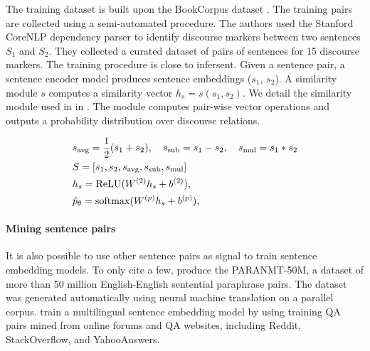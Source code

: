 The training dataset is built upon the BookCorpus dataset \parencite{zhu_15}. The training pairs are collected using a semi-automated procedure. The authors used the Stanford CoreNLP dependency parser \parencite{schuster_16} to identify discourse markers between two sentences $S_1$ and $S_2$. They collected a curated dataset of  pairs of sentences for 15 discourse markers. The training procedure is close to infersent. Given a sentence pair, a sentence encoder model produces sentence embeddings ($s_1$, $s_2$). A similarity module $s$ computes a similarity vector $h_s = s(s_1, s_2)$. We detail the similarity module used in \textcite{nie_19} in . The module computes pair-wise vector operations and outputs a probability distribution over discourse relations.

\begin{equation}
\begin{split}
    &s_{\text{avg}} = \frac{1}{2} (s_1 + s_2), ~~~s_{\text{sub}} = s_1 - s_2, ~~~s_{\text{mul}} = s_1 * s_2 \\
    &S = [s_1, s_2, s_{\text{avg}}, s_{\text{sub}}, s_{\text{mul}}]\\
    &h_s = \relu(W^{(2)}h_s + b^{(2)}), \\
    &\hat{p}_{\theta} = \softmax(W^{(p)}h_s + b^{(p)}), \\
\end{split}
\labeq{similarity:2}
\end{equation}

\paragraph{Mining sentence pairs} 

It is also possible to use other sentence pairs as signal to train sentence embedding models. To only cite a few, \textcite{gimpel_18} produce the PARANMT-50M, a dataset of more than 50 million English-English sentential paraphrase pairs. The dataset was generated automatically using neural machine translation on a parallel corpus. \textcite{yang_20} train a multilingual sentence embedding model by using training QA pairs mined from online forums and QA websites, including Reddit, StackOverflow, and YahooAnswers.

